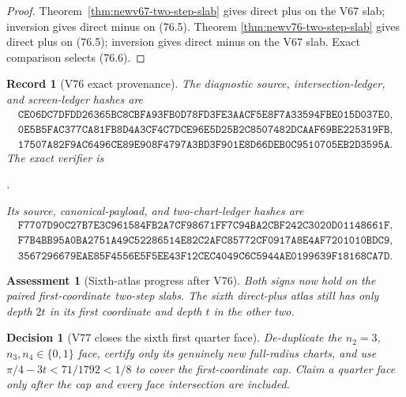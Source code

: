 \documentclass[11pt,oneside]{article}
\newtheorem{assessment}[theorem]{Assessment}
\newtheorem{record}[theorem]{Record}
\newtheorem{decision}[theorem]{Decision}
\theoremstyle{definition}
\theoremstyle{remark}
\begin{document}
\begin{proof}
Theorem~\ref{thm:newv67-two-step-slab} gives direct plus on the V67
slab; inversion gives direct minus on (76.5).  Theorem
\ref{thm:newv76-two-step-slab} gives direct plus on (76.5);
inversion gives direct minus on the V67 slab.  Exact comparison
selects (76.6).
\end{proof}

\begin{record}[V76 exact provenance]
\label{rec:newv76-provenance}
The diagnostic source, intersection-ledger, and screen-ledger hashes
are
\[
\begin{gathered}
\texttt{CE06DC7DFDD26365BC8CBFA93FB0D78FD3FE3AACF5E8F7A33594FBE015D037E0},\\
\texttt{0E5B5FAC377CA81FB8D4A3CF4C7DCE96E5D25B2C8507482DCAAF69BE225319FB},\\
\texttt{17507A82F9AC6496CE89E908F4797A3BD3F901E8D66DEB0C9510705EB2D3595A}.
\end{gathered}                                          \tag{76.7}
\]
The exact verifier is
\begin{center}
\footnotesize
{}.
\end{center}
Its source, canonical-payload, and two-chart-ledger hashes are
\[
\begin{gathered}
\texttt{F7707D90C27B7E3C961584FB2A7CF98671FF7C94BA2CBF242C3020D01148661F},\\
\texttt{F7B4BB95A0BA2751A49C52286514E82C2AFC85772CF0917A8E4AF7201010BDC9},\\
\texttt{3567296679EAE85F4556E5F5EE43F12CEC4049C6C5944AE0199639F18168CA7D}.
\end{gathered}                                          \tag{76.8}
\]
\end{record}

\begin{assessment}[Sixth-atlas progress after V76]
\label{ass:newv76}
Both signs now hold on the paired first-coordinate two-step slabs.
The sixth direct-plus atlas still has only depth \(2t\) in its first
coordinate and depth \(t\) in the other two.
\end{assessment}

\begin{decision}[V77 closes the sixth first quarter face]
\label{dec:newv76-next}
De-duplicate the \(n_2=3\), \(n_3,n_4\in\{0,1\}\) face, certify only
its genuinely new full-radius charts, and use
\(\pi/4-3t<71/1792<1/8\) to cover the first-coordinate cap.  Claim a
quarter face only after the cap and every face intersection are
included.
\end{decision}
\end{document}
